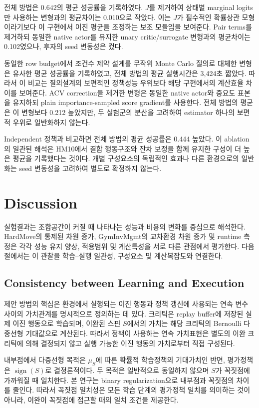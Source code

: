 \documentclass[10pt,journal]{IEEEtran}
\begin{document}
전체 방법은 $0.642$의 평균 성공률을 기록하였다. $J$를 제거하여 상태별 marginal logits만 사용하는 변형과의 평균차이는 0.010으로 작았다. 이는 $J$가 필수적인 확률상관 모형이라기보다 이 구현에서 이진 평균을 조정하는 보조 모듈임을 보여준다. Pair terms를 제거하되 동일한 native actor를 유지한 unary critic/surrogate 변형과의 평균차이는 0.102였으나, 후자의 seed 변동성은 컸다.

동일한 row budget에서 조건수 제약 설계를 무작위 Monte Carlo 질의로 대체한 변형은 유사한 평균 성공률을 기록하였고, 전체 방법의 평균 실행시간은 3,424초 짧았다. 따라서 이 비교는 질의설계의 보편적인 정책성능 우위보다 해당 구현에서의 계산효율 차이를 보여준다. ACV correction을 제거한 변형은 동일한 native actor와 중요도 표본을 유지하되 plain importance-sampled score gradient를 사용한다. 전체 방법의 평균은 이 변형보다 0.212 높았지만, 두 실험군의 분산을 고려하여 estimator 하나의 보편적 우위로 일반화하지 않는다.

Independent 정책과 비교하면 전체 방법의 평균 성공률은 0.444 높았다. 이 ablation의 일관된 해석은 HM10에서 결합 행동구조와 잔차 보정을 함께 유지한 구성이 더 높은 평균을 기록했다는 것이다. 개별 구성요소의 독립적인 효과나 다른 환경으로의 일반화는 seed 변동성을 고려하여 별도로 확정하지 않는다.


\section{Discussion}
\label{sec:discussion}

실험결과는 조합공간이 커질 때 나타나는 성능과 비용의 변화를 중심으로 해석한다. HardMove의 통제된 차원 증가, GymInvMgmt의 교차환경 차원 증가 및 runtime 측정은 각각 성능 유지 양상, 적용범위 및 계산특성을 서로 다른 관점에서 평가한다. 다음 절에서는 이 관찰을 학습--실행 일관성, 구성요소 및 계산복잡도와 연결한다.

\subsection{Consistency between Learning and Execution}

제안 방법의 핵심은 환경에서 실행되는 이진 행동과 정책 갱신에 사용되는 연속 변수 사이의 가치관계를 명시적으로 정의하는 데 있다. 크리틱은 replay buffer에 저장된 실제 이진 행동으로 학습되며, 이완된 스핀 $S$에서의 가치는 해당 크리틱의 Bernoulli 다중선형 기대값으로 계산된다. 따라서 정책이 사용하는 연속 가치표현은 별도의 이완 크리틱에 의해 결정되지 않고 실행 가능한 이진 행동의 가치로부터 직접 구성된다.

내부점에서 다중선형 목적은 $\mu_S$에 따른 확률적 학습정책의 기대가치인 반면, 평가정책은 $\operatorname{sign}(S)$로 결정론적이다. 두 목적은 일반적으로 동일하지 않으며 $S$가 꼭짓점에 가까워질 때 일치한다. 본 연구는 binary regularization으로 내부점과 꼭짓점의 차이를 줄인다. 따라서 꼭짓점 일치성은 모든 학습 단계의 평가정책 일치를 의미하는 것이 아니라, 이완이 꼭짓점에 접근할 때의 일치 조건을 제공한다.
\end{document}
